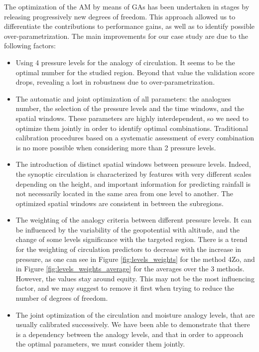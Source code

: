 \documentclass[5p]{elsarticle}
\begin{document}
The optimization of the AM by means of GAs has been undertaken in stages by releasing progressively new degrees of freedom. This approach allowed us to differentiate the contributions to performance gains, as well as to identify possible over-parametrization. The main improvements for our case study are due to the following factors:

\begin{itemize}
	\item Using 4 pressure levels for the analogy of circulation. It seems to be the optimal number for the studied region. Beyond that value the validation score drops, revealing a lost in robustness due to over-parametrization.
	\item The automatic and joint optimization of all parameters: the analogues number, the selection of the pressure levels and the time windows, and the spatial windows. These parameters are highly interdependent, so we need to optimize them jointly in order to identify optimal combinations. Traditional calibration procedures based on a systematic assessment of every combination is no more possible when considering more than 2 pressure levels.
	\item The introduction of distinct spatial windows between pressure levels. Indeed, the synoptic circulation is characterized by features with very different scales depending on the height, and important information for predicting rainfall is not necessarily located in the same area from one level to another. The optimized spatial windows are consistent in between the subregions.
	\item The weighting of the analogy criteria between different pressure levels. It can be influenced by the variability of the geopotential with altitude, and the change of some levels significance with the targeted region. There is a trend for the weighting of circulation predictors to decrease with the increase in pressure, as one can see in Figure \ref{fig:levels_weights} for the method 4Zo, and in Figure \ref{fig:levels_weights_average} for the averages over the 3 methods. However, the values stay around equity. This may not be the most influencing factor, and we may suggest to remove it first when trying to reduce the number of degrees of freedom.
	\item The joint optimization of the circulation and moisture analogy levels, that are usually calibrated successively. We have been able to demonstrate that there is a dependency between the analogy levels, and that in order to approach the optimal parameters, we must consider them jointly.
\end{itemize}
\end{document}
